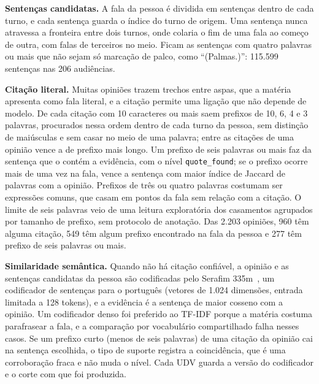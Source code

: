 \textbf{Sentenças candidatas.} A fala da pessoa é dividida em sentenças dentro de cada turno, e
cada sentença guarda o índice do turno de origem. Uma sentença nunca atravessa a fronteira entre dois
turnos, onde colaria o fim de uma fala ao começo de outra, com falas de terceiros no meio. Ficam as
sentenças com quatro palavras ou mais que não sejam só marcação de palco, como ``(Palmas.)'': 115.599
sentenças nas 206 audiências.

\textbf{Citação literal.} Muitas opiniões trazem trechos entre aspas, que a matéria apresenta como
fala literal, e a citação permite uma ligação que não depende de modelo. De cada citação com 10
caracteres ou mais saem prefixos de 10, 6, 4 e 3 palavras, procurados nessa ordem dentro de cada turno
da pessoa, sem distinção de maiúsculas e sem casar no meio de uma palavra; entre as citações de uma
opinião vence a de prefixo mais longo. Um prefixo de seis palavras ou mais faz da sentença que o
contém a evidência, com o nível \texttt{quote\_found}; se o prefixo ocorre mais de uma vez na fala, vence
a sentença com maior índice de Jaccard de palavras com a opinião. Prefixos de três ou quatro palavras
costumam ser expressões comuns, que casam em pontos da fala sem relação com a citação. O limite de seis
palavras veio de uma leitura exploratória dos casamentos agrupados por tamanho de prefixo, sem
protocolo de anotação. Das 2.203 opiniões, 960 têm alguma citação, 549 têm algum prefixo encontrado na
fala da pessoa e 277 têm prefixo de seis palavras ou mais.

\textbf{Similaridade semântica.} Quando não há citação confiável, a opinião e as sentenças
candidatas da pessoa são codificadas pelo Serafim 335m~\citep{gomes2024serafim}, um codificador de
sentenças para o português (vetores de 1.024 dimensões, entrada limitada a 128 tokens), e a evidência
é a sentença de maior cosseno com a opinião. Um codificador denso foi preferido ao TF-IDF porque a
matéria costuma parafrasear a fala, e a comparação por vocabulário compartilhado falha nesses casos.
Se um prefixo curto (menos de seis palavras) de uma citação da opinião cai na sentença escolhida, o
tipo de suporte registra a coincidência, que é uma corroboração fraca e não muda o nível. Cada UDV
guarda a versão do codificador e o corte com que foi produzida.

